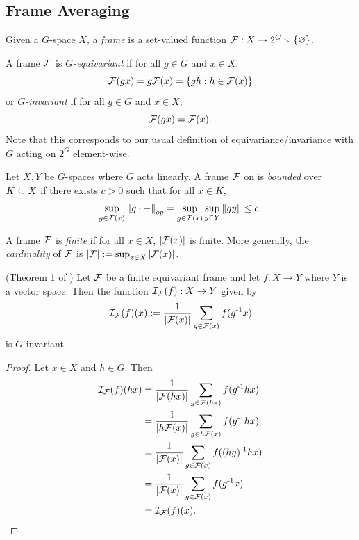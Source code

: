\subsection{Frame Averaging}\label{sec:bg-frame-averaging}
\begin{definition}
    Given a $G$-space $X$, a \emph{frame} is a set-valued function $\mathcal{F} : X \to 2^G \smallsetminus \left\{ \varnothing \right\}$.
\end{definition}

\begin{definition}
    A frame $\mathcal{F}$ is \emph{$G$-equivariant} if for all $g \in G$ and $x \in X$,
    \[
        \mathcal{F}(gx) = g\mathcal{F}(x) = \left\{ gh : h \in \mathcal{F}(x) \right\}
    \]
    or \emph{$G$-invariant} if for all $g \in G$ and $x \in X$,
    \[
        \mathcal{F}(gx) = \mathcal{F}(x).
    \]
    Note that this corresponds to our usual definition of equivariance/invariance with $G$ acting on $2^G$ element-wise.
\end{definition}

\begin{definition}
    Let $X,Y$ be $G$-spaces where $G$ acts linearly.
    A frame $\mathcal{F}$ on is \emph{bounded} over $K \subseteq X$ if there exists $c > 0$ such that for all $x \in K$,
    \[
        \sup_{g \in \mathcal{F}(x)} \left\| g \cdot - \right\|_{op}
        = \sup_{g \in \mathcal{F}(x)} \sup_{y \in Y} \left\| gy \right\|
        \leq c.
    \]
\end{definition}

\begin{definition}
    A frame $\mathcal{F}$ is \emph{finite} if for all $x \in X$, $\left| \mathcal{F}(x) \right|$ is finite.
    More generally, the \emph{cardinality} of $\mathcal{F}$ is $\left| \mathcal{F} \right| := \sup_{x \in X} \left| \mathcal{F}(x) \right|$.
\end{definition}

\begin{proposition}\label{prop:invariant-frame-average}
    (Theorem 1 of \cite{puny2022frameaveraginginvariantequivariant})
    Let $\mathcal{F}$ be a finite equivariant frame and let $f : X \to Y$ where $Y$ is a vector space.
    Then the function $\mathcal{I}_{\mathcal{F}}(f) : X \to Y$ given by
    \[
        \mathcal{I}_{\mathcal{F}} (f) (x) := \frac{1}{\left| \mathcal{F}(x) \right|} \sum_{g \in \mathcal{F}(x)} f(g^{\text{-}1} x)
    \]
    is $G$-invariant.
    \begin{proof}
        Let $x \in X$ and $h \in G$.
        Then
        \begin{align*}
            \mathcal{I}_{\mathcal{F}} (f) (hx)
            &= \frac{1}{\left| \mathcal{F}(hx) \right|} \sum_{g \in \mathcal{F}(hx)} f(g^{\text{-}1} hx) \\
            &= \frac{1}{\left| h\mathcal{F}(x) \right|} \sum_{g \in h\mathcal{F}(x)} f(g^{\text{-}1} hx) \\
            &= \frac{1}{\left| \mathcal{F}(x) \right|} \sum_{g \in \mathcal{F}(x)} f((hg)^{\text{-}1} hx) \\
            &= \frac{1}{\left| \mathcal{F}(x) \right|} \sum_{g \in \mathcal{F}(x)} f(g^{\text{-}1} x) \\
            &= \mathcal{I}_{\mathcal{F}} (f) (x).
        \end{align*}
    \end{proof}
\end{proposition}

